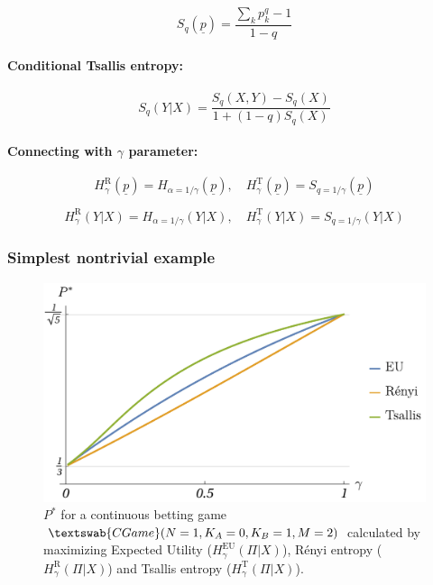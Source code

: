 \documentclass{article}
\theoremstyle{definition}
\newcommand{\CG}[1]{$\textswab{CGame}(#1)$}
\begin{document}
\begin{equation}
    S_q(\underline{p}) = \frac{\sum_k p_k^q - 1}{1-q}
\end{equation}

\paragraph{Conditional Tsallis entropy:} \cite{book:TsallisGellMann,paper:ConditionalTsallis}

\begin{equation}
    S_q(Y|X) = \frac{S_q(X,Y) - S_q(X)}{1+ (1-q) S_q(X)}
\end{equation}

\paragraph{Connecting with $\gamma$ parameter:}

\begin{equation}
    H^\mathrm{R}_\gamma(\underline{p}) = H_{\alpha = 1/\gamma}(\underline{p}), \quad
    H^\mathrm{T}_\gamma(\underline{p}) = S_{q=1/\gamma}(\underline{p})
\end{equation}

\begin{equation}
    H^\mathrm{R}_\gamma(Y|X) = H_{\alpha = 1/\gamma}(Y|X), \quad
    H^\mathrm{T}_\gamma(Y|X) = S_{q = 1/\gamma}(Y|X)
\end{equation}

\subsubsection{Simplest nontrivial example}
\label{sec:EntropiesSimplestPriors}

\begin{figure}[H]
    \centering
    \includegraphics[width=10 cm]{img/EURT_1012_01.pdf}
    \caption{$P^*$ for a continuous betting game \CG{N=1,K_A=0,K_B=1,M=2} calculated by maximizing Expected Utility ($H^\text{EU}_\gamma(\Pi|X)$), Rényi entropy ($H^\text{R}_\gamma(\Pi|X)$) and Tsallis entropy ($H^\text{T}_\gamma(\Pi|X)$).}
    \label{fig:EURT_01}
\end{figure}
\end{document}

